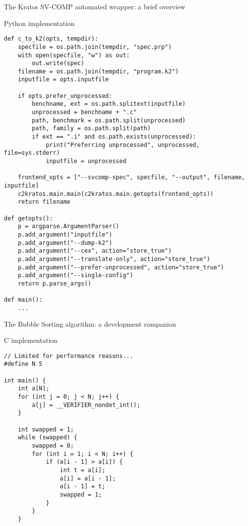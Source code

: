\begin{frame}[fragile]{The Kratos SV-COMP automated wrapper: a brief overview}
    \begin{block}{Python implementation}
            \begin{verbatim}
def c_to_k2(opts, tempdir):
    specfile = os.path.join(tempdir, "spec.prp")
    with open(specfile, "w") as out:
        out.write(spec)
    filename = os.path.join(tempdir, "program.k2")
    inputfile = opts.inputfile

    if opts.prefer_unprocessed:
        benchname, ext = os.path.splitext(inputfile)
        unprocessed = benchname + ".c"
        path, benchmark = os.path.split(unprocessed)
        path, family = os.path.split(path)
        if ext == ".i" and os.path.exists(unprocessed):
            print("Preferring unprocessed", unprocessed, file=sys.stderr)
            inputfile = unprocessed

    frontend_opts = ["--svcomp-spec", specfile, "--output", filename, inputfile]
    c2kratos.main.main(c2kratos.main.getopts(frontend_opts))
    return filename

def getopts():
    p = argparse.ArgumentParser()
    p.add_argument("inputfile")
    p.add_argument("--dump-k2")
    p.add_argument("--cex", action="store_true")
    p.add_argument("--translate-only", action="store_true")
    p.add_argument("--prefer-unprocessed", action="store_true")
    p.add_argument("--single-config")
    return p.parse_args()

def main():
    ...
            \end{verbatim}
    \end{block}
\end{frame}

\begin{frame}[fragile]{The Bubble Sorting algorithm: a development companion}
    \begin{block}{C implementation}
            \begin{verbatim}
// Limited for performance reasons...
#define N 5

int main() {
    int a[N];
    for (int j = 0; j < N; j++) {
        a[j] = __VERIFIER_nondet_int();
    }

    int swapped = 1;
    while (swapped) {
        swapped = 0;
        for (int i = 1; i < N; i++) {
            if (a[i - 1] > a[i]) {
                int t = a[i];
                a[i] = a[i - 1];
                a[i - 1] = t;
                swapped = 1;
            }
        }
    }
            \end{verbatim}
    \end{block}
\end{frame}

